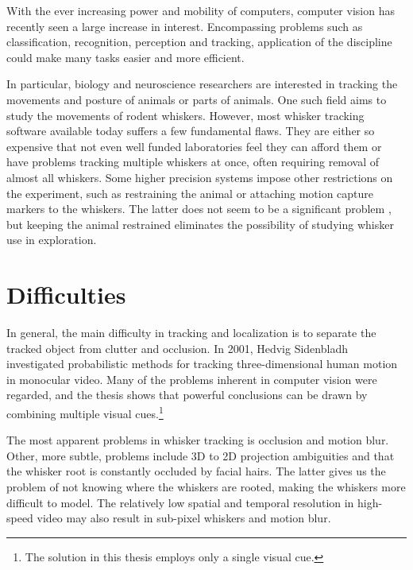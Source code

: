 With the ever increasing power and mobility of computers, computer
vision has recently seen a large increase in interest.  Encompassing
problems such as classification, recognition, perception and tracking,
application of the discipline could make many tasks easier and more
efficient.

In particular, biology and neuroscience researchers are interested in
tracking the movements and posture \cite{WhiskerVideography} of
animals or parts of animals.  One such field aims to study the
movements of rodent whiskers. However, most whisker tracking software
available today suffers a few fundamental flaws.  They are either so
expensive that not even well funded laboratories feel they can afford
them or have problems tracking multiple whiskers at once, often
requiring removal of almost all whiskers.  Some higher precision
systems impose other restrictions on the experiment, such as
restraining the animal or attaching motion capture markers to the
whiskers. The latter does not seem to be a significant problem
\cite{BadExample1}, but keeping the animal restrained eliminates the
possibility of studying whisker use in exploration.

\section{Difficulties}
In general, the main difficulty in tracking and localization is to
separate the tracked object from clutter and occlusion. In 2001,
Hedvig Sidenbladh investigated probabilistic methods for tracking
three-dimensional human motion in monocular video. \cite{Hedvig} Many
of the problems inherent in computer vision were regarded, and the
thesis shows that powerful conclusions can be drawn by combining
multiple visual cues.\footnote{The solution in this thesis employs
  only a single visual cue.}

The most apparent problems in whisker tracking is occlusion and motion
blur. Other, more subtle, problems include 3D to 2D projection
ambiguities and that the whisker root is constantly occluded by facial
hairs. The latter gives us the problem of not knowing where the
whiskers are rooted, making the whiskers more difficult to model. The
relatively low spatial and temporal resolution in high-speed video may
also result in sub-pixel whiskers and motion
blur.\cite{WhiskerVideography}



